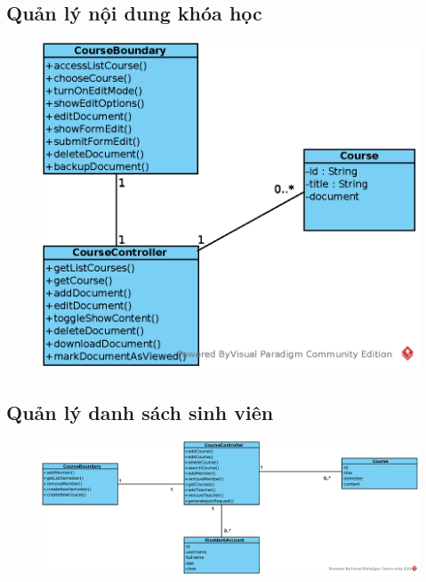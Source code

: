 \documentclass[./../main_file.tex]{subfiles}
\begin{document}
	\subsection{Quản lý nội dung khóa học }
	\begin{figure}[H]
		\centering
		\includegraphics[width=\linewidth]{./images/VOPCs/3_13_manage_contentcourse.eps}
	\end{figure}	
	
	\subsection{Quản lý danh sách sinh viên}
	\begin{figure}[H]
		\centering
		\includegraphics[width=\linewidth]{./images/VOPCs/3_14_add_member_to_course.eps}	
	\end{figure}
	
	
\end{document}
